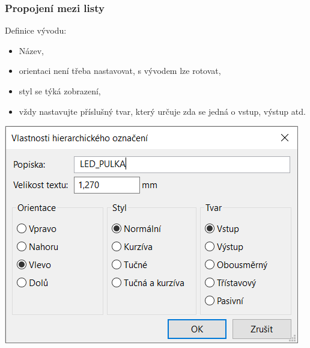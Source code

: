 \documentclass{beamer}
\begin{document}
\begin{frame}
	\frametitle{Propojení mezi listy}
	\small
	Definice vývodu:
	
	\begin{itemize}
		\item Název,
		\item orientaci není třeba nastavovat, s vývodem lze rotovat,
		\item styl se týká zobrazení,
		\item vždy nastavujte příslušný tvar, který určuje zda se jedná o vstup, výstup atd.
	\end{itemize}
	
	\begin{center}
		\includegraphics[scale=0.5]{obr/dalsi_strana06.png}
	\end{center}

\end{frame}
\end{document}
